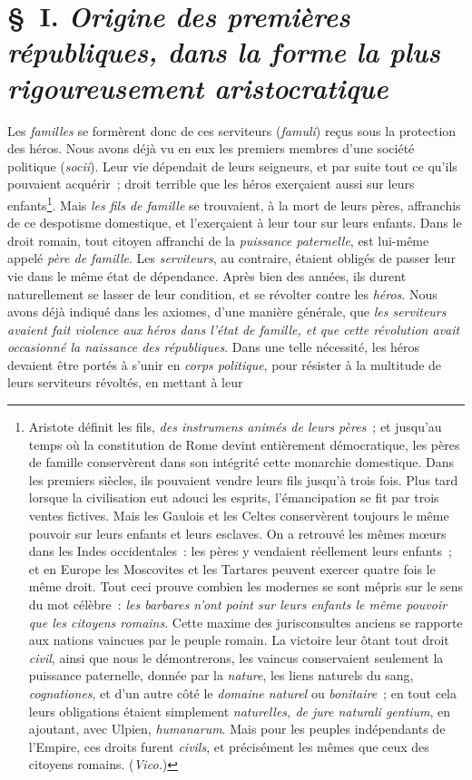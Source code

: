 \documentclass[french,twoside]{book} %
\begin{document}
\section[{§ I. Origine des premières républiques, dans la forme la plus rigoureusement aristocratique}]{§ I. {\itshape Origine des premières républiques, dans la forme la plus rigoureusement aristocratique}}
\noindent  Les {\itshape familles} se formèrent donc de ces serviteurs ({\itshape famuli}) reçus sous la protection des héros. Nous avons déjà vu en eux les premiers membres d’une société politique ({\itshape socii}). Leur vie dépendait de leurs seigneurs, et par suite tout ce qu’ils pouvaient acquérir ; droit terrible que les héros exerçaient aussi sur leurs enfants\footnote{Aristote définit les fils, \emph{{\itshape des instrumens animés de leurs pères}} ; et jusqu’au temps où la constitution de Rome devint entièrement démocratique, les pères de famille conservèrent dans son intégrité cette monarchie domestique. Dans les premiers siècles, ils pouvaient vendre leurs fils jusqu’à trois fois. Plus tard lorsque la civilisation eut adouci les esprits, l’émancipation se fit par trois ventes fictives. Mais les Gaulois et les Celtes conservèrent toujours le même pouvoir sur leurs enfants et leurs esclaves. On a retrouvé les mêmes mœurs dans les Indes occidentales : les pères y vendaient réellement leurs enfants ; et en Europe les Moscovites et les Tartares peuvent exercer quatre fois le même droit. Tout ceci prouve combien les modernes se sont mépris sur le sens du mot célèbre : {\itshape les barbares n’ont point sur leurs enfants le même pouvoir que les citoyens romains}. Cette maxime des jurisconsultes anciens se rapporte aux nations vaincues par le peuple romain. La victoire leur ôtant tout droit {\itshape civil}, ainsi que nous le démontrerons, les vaincus conservaient seulement la puissance paternelle, donnée par la {\itshape nature}, les liens naturels du sang, {\itshape cognationes}, et d’un autre côté le {\itshape domaine naturel} ou {\itshape bonitaire} ; en tout cela leurs obligations étaient simplement {\itshape naturelles, de jure naturali gentium}, en ajoutant, avec Ulpien, {\itshape humanarum}. Mais pour les peuples indépendants de l’Empire, ces droits furent {\itshape civils}, et précisément les mêmes que ceux des citoyens romains. ({\itshape Vico.})}. Mais {\itshape les fils de famille} se trouvaient,  à la mort de leurs pères, affranchis de ce despotisme domestique, et l’exerçaient à leur tour sur leurs enfants. Dans le droit romain, tout citoyen affranchi de la {\itshape puissance paternelle}, est lui-même appelé {\itshape père de famille}. Les {\itshape serviteurs}, au contraire, étaient obligés de passer leur vie dans le même état de dépendance. Après bien des années, ils durent naturellement se lasser de leur condition, et se révolter contre les {\itshape héros}. Nous avons déjà indiqué dans les axiomes, d’une manière générale, que {\itshape les serviteurs avaient fait violence aux héros dans l’état de famille, et que cette révolution avait occasionné la naissance des républiques}. Dans une telle nécessité, les héros devaient être portés à s’unir en {\itshape corps politique}, pour résister à la multitude de leurs serviteurs révoltés, en mettant à leur 
\end{document}
